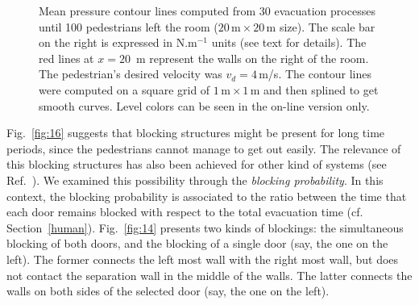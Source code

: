 \begin{figure}[!htbp]
\hfill
{}
\caption{\label{fig:16and17} Mean pressure contour lines computed from 30 
evacuation processes until 100 pedestrians left the room 
($20\,\mathrm{m}\times20\,\mathrm{m}$ size). The scale bar on the right is 
expressed in N.m$^{-1}$ units (see text for details). The red lines at 
$x=20$~m represent the walls on the right of the room. The pedestrian's desired 
velocity was $v_d=4\,$m/s. The contour lines were computed on a square grid of 
$1\,\mathrm{m}\times1\,\mathrm{m}$ and then splined to get smooth curves. Level 
colors can be seen in the on-line version only.} 
\end{figure}


Fig.~\ref{fig:16} suggests that blocking structures might be present for long 
time periods, since the pedestrians cannot manage to get out easily.  {\color{red} The relevance of this blocking structures has also been achieved for other kind of systems (see Ref.~\cite{kunte}). } We 
examined this possibility through the \textit{blocking probability}. In this 
context, the blocking probability is associated to the ratio between the time 
that each door remains blocked with respect to the total evacuation time (cf. 
Section~\ref{human}). Fig.~\ref{fig:14} presents two kinds of blockings: the 
simultaneous blocking of both doors, and the blocking of a single door (say, 
the one on the left). The former connects the left most wall with the right 
most wall, but does not contact the separation wall in the middle of the walls. 
The latter connects the walls on both sides of the selected door (say, 
the one on the left). \\


